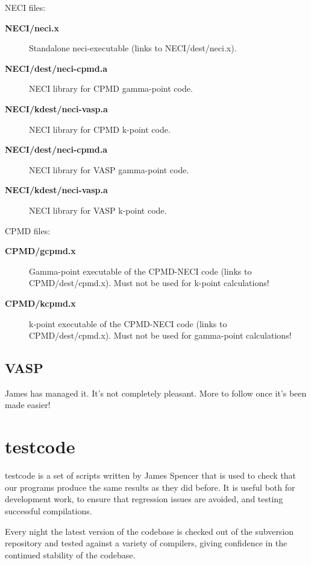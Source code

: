 \documentclass[openany,a4paper,10pt]{manual}
\begin{document}
NECI files:
\begin{description}
\item[\textbf{NECI/neci.x}]
Standalone neci-executable (links to NECI/dest/neci.x).

\item[\textbf{NECI/dest/neci-cpmd.a}]
NECI library for CPMD gamma-point code.

\item[\textbf{NECI/kdest/neci-vasp.a}]
NECI library for CPMD k-point code.

\item[\textbf{NECI/dest/neci-cpmd.a}]
NECI library for VASP gamma-point code.

\item[\textbf{NECI/kdest/neci-vasp.a}]
NECI library for VASP k-point code.

\end{description}

CPMD files:
\begin{description}
\item[\textbf{CPMD/gcpmd.x}]
Gamma-point executable of the CPMD-NECI code (links to CPMD/dest/cpmd.x).
Must not be used for k-point calculations!

\item[\textbf{CPMD/kcpmd.x}]
k-point executable of the CPMD-NECI code (links to CPMD/dest/cpmd.x).
Must not be used for gamma-point calculations!

\end{description}


\subsection{VASP}

James has managed it.  It's not completely pleasant.  More to follow
once it's been made easier!


\section{testcode}

testcode is a set of scripts written by James Spencer that is used to
check that our programs produce the same results as they did before.
It is useful both for development work, to ensure that regression issues
are avoided, and testing successful compilations.

Every night the latest version of the codebase is checked out of the
subversion repository and tested against a variety of compilers, giving
confidence in the continued stability of the codebase.
\end{document}
